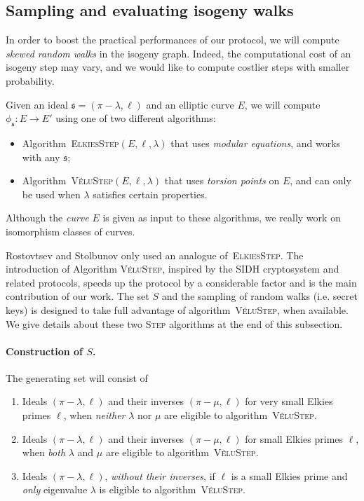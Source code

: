 \documentclass{article}
\newcommand{\algstyle}[1]{\textsc{#1}}
\renewcommand{\frak}{\mathfrak}
\theoremstyle{definition}
\begin{document}
\subsection{Sampling and evaluating isogeny walks}

In order to boost the practical performances of our protocol,
we will compute \emph{skewed random walks} in the isogeny graph.
Indeed, the computational cost of an isogeny step may vary, and
we would like to compute costlier steps with smaller probability.

Given an ideal $\frak s = (\pi-\lambda, \ell)$ and an elliptic curve $E$,
we will compute $\phi_{\frak s}:E\to E'$ using one of two different algorithms:
\begin{itemize}
\item Algorithm~\algstyle{ElkiesStep}$(E, \ell, \lambda)$ that uses
	\emph{modular equations}, and works with any $\frak s$;
\item Algorithm~\algstyle{VéluStep}$(E, \ell,\lambda)$ that
	uses \emph{torsion points} on $E$, and can only be used when
	$\lambda$ satisfies certain properties.
\end{itemize}
Although the \emph{curve} $E$ is given as input to these algorithms,
we really work on isomorphism classes of curves.

Rostovtsev and Stolbunov only used an analogue of~\algstyle{ElkiesStep}. 
The introduction of Algorithm \algstyle{VéluStep}, 
inspired by the SIDH cryptosystem and related protocols,
speeds up the protocol by a considerable factor and
is the main contribution of our work. The set $S$ and the
sampling of random walks (i.e. secret keys) is designed
to take full advantage of algorithm~\algstyle{VéluStep},
when available. We give details about these two \algstyle{Step}
algorithms at the end of this subsection.

\paragraph{Construction of $S$.} The generating set will consist of

\begin{enumerate}
\item \label{case:elkstep} Ideals $(\pi - \lambda, \ell)$ and their inverses $(\pi - \mu, \ell)$
	for very small Elkies primes $\ell$, when \emph{neither} $\lambda$ nor $\mu$
	are eligible to algorithm~\algstyle{VéluStep}.
\item \label{case:velustep-sym} Ideals $(\pi - \lambda, \ell)$ and their inverses $(\pi - \mu, \ell)$
	for small Elkies primes $\ell$, when \emph{both} $\lambda$ and $\mu$
	are eligible to algorithm~\algstyle{VéluStep}.
\item \label{case:velustep-asym} Ideals $(\pi - \lambda, \ell)$, \emph{without their inverses},
	if $\ell$ is a small Elkies prime and \emph{only} eigenvalue $\lambda$
	is eligible to algorithm~\algstyle{VéluStep}.
\end{enumerate}
\end{document}
